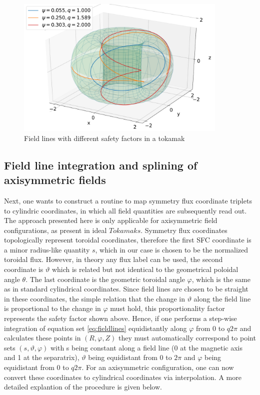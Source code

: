 \documentclass[./main.tex]{subfiles}
\begin{document}
\begin{figure}[h]
	\includegraphics[width=0.9\textwidth]{figures/field_lines_torus.pdf}
	\caption{Field lines with different safety factors in a tokamak}
	\label{fig:field_lines_torus}
\end{figure}



\subsection{Field line integration and splining of axisymmetric fields}
Next, one wants to construct a routine to map symmetry flux coordinate triplets to cylindric coordinates, in which all field quantities are subsequently read out.
The approach presented here is only applicable for axisymmetric field configurations, as present in ideal $Tokamaks$.
 Symmetry flux coordinates topologically represent toroidal coordinates, therefore the first SFC coordinate is a minor radius-like quantity $s$, which in our case is chosen to be the normalized toroidal flux. However, in theory any flux label can be used, the second coordinate is $\vartheta$ which is related but not identical to the geometrical poloidal angle $\theta$. The last coordinate is the geometric toroidal angle $\varphi$, which is the same as in standard cylindrical coordinates. Since field lines are chosen to be straight in these coordinates, the simple relation that the change in $\vartheta$ along the field line is proportional to the change in $\varphi$ must hold, this proportionality factor represents the safety factor shown above. Hence, if one performs a step-wise integration of equation set \ref{eq:fieldlines} equidistantly along $\varphi$ from 0 to $q2\pi$ and calculates these points in $(R,\varphi,Z)$ they must automatically correspond to point sets $(s,\vartheta,\varphi)$ with s being constant along a field line (0 at the magnetic axis and 1 at the separatrix), $\vartheta$ being equidistant from 0 to $2\pi$ and $\varphi$ being equidistant from 0 to $q2\pi$. For an axisymmetric configuration, one can now convert these coordinates to cylindrical coordinates via interpolation. A more detailed explantion of the procedure is given below.
\end{document}

